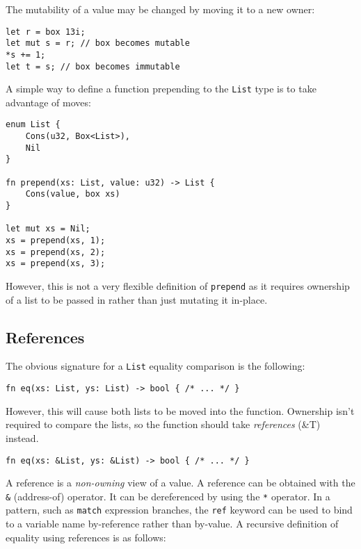 \documentclass[]{article}
\begin{document}
The mutability of a value may be changed by moving it to a new owner:

\begin{verbatim}
let r = box 13i;
let mut s = r; // box becomes mutable
*s += 1;
let t = s; // box becomes immutable
\end{verbatim}

A simple way to define a function prepending to the \texttt{List} type
is to take advantage of moves:

\begin{verbatim}
enum List {
    Cons(u32, Box<List>),
    Nil
}

fn prepend(xs: List, value: u32) -> List {
    Cons(value, box xs)
}

let mut xs = Nil;
xs = prepend(xs, 1);
xs = prepend(xs, 2);
xs = prepend(xs, 3);
\end{verbatim}

However, this is not a very flexible definition of \texttt{prepend} as
it requires ownership of a list to be passed in rather than just
mutating it in-place.

\subsection{References}\label{references}

The obvious signature for a \texttt{List} equality comparison is the
following:

\begin{verbatim}
fn eq(xs: List, ys: List) -> bool { /* ... */ }
\end{verbatim}

However, this will cause both lists to be moved into the function.
Ownership isn't required to compare the lists, so the function should
take \emph{references} (\&T) instead.

\begin{verbatim}
fn eq(xs: &List, ys: &List) -> bool { /* ... */ }
\end{verbatim}

A reference is a \emph{non-owning} view of a value. A reference can be
obtained with the \texttt{\&} (address-of) operator. It can be
dereferenced by using the \texttt{*} operator. In a pattern, such as
\texttt{match} expression branches, the \texttt{ref} keyword can be used
to bind to a variable name by-reference rather than by-value. A
recursive definition of equality using references is as follows:
\end{document}
